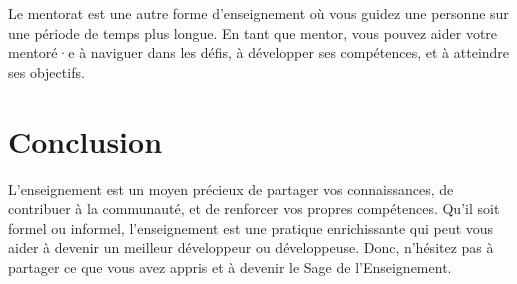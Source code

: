 Le mentorat est une autre forme d'enseignement où vous guidez une personne sur une période de temps plus longue. En tant que mentor, vous pouvez aider votre mentoré·e à naviguer dans les défis, à développer ses compétences, et à atteindre ses objectifs.

\section{Conclusion}

L'enseignement est un moyen précieux de partager vos connaissances, de contribuer à la communauté, et de renforcer vos propres compétences. Qu'il soit formel ou informel, l'enseignement est une pratique enrichissante qui peut vous aider à devenir un meilleur développeur ou développeuse. Donc, n'hésitez pas à partager ce que vous avez appris et à devenir le Sage de l'Enseignement.

